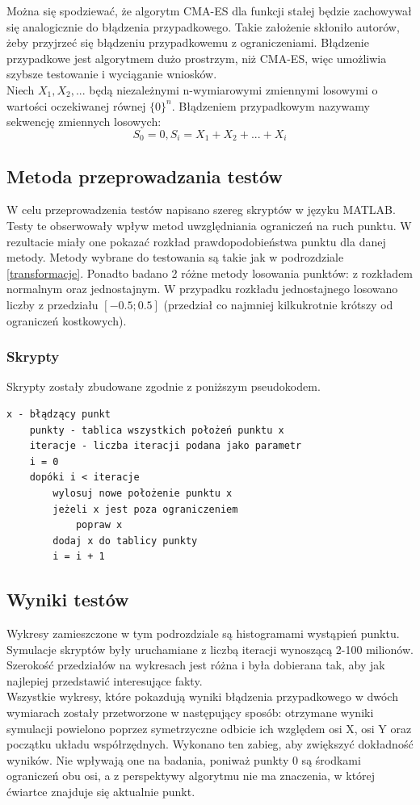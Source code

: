 \documentclass{mini}
\begin{document}
Można się spodziewać, że algorytm CMA-ES dla funkcji stałej będzie zachowywał się analogicznie do błądzenia przypadkowego. Takie założenie skłoniło autorów, żeby przyjrzeć się błądzeniu przypadkowemu z ograniczeniami. Błądzenie przypadkowe jest algorytmem dużo prostrzym, niż CMA-ES, więc umożliwia szybsze testowanie i wyciąganie wniosków.\\
Niech $ X_1, X_2, ... $ będą niezależnymi n-wymiarowymi zmiennymi losowymi o wartości oczekiwanej równej $ \{0\}^n $. Błądzeniem przypadkowym nazywamy sekwencję zmiennych losowych:
\begin{equation}
S_0 = 0, S_i=X_1+X_2+...+X_i
\end{equation}

\subsection{Metoda przeprowadzania testów}
W celu przeprowadzenia testów napisano szereg skryptów w języku MATLAB. Testy te obserwowały wpływ metod uwzględniania ograniczeń na ruch punktu. W rezultacie miały one pokazać rozkład prawdopodobieństwa punktu dla danej metody. Metody wybrane do testowania są takie jak w podrozdziale \ref{transformacje}.
Ponadto badano 2 różne metody losowania punktów: z rozkładem normalnym oraz jednostajnym. W przypadku rozkładu jednostajnego losowano liczby z przedziału $[-0.5; 0.5]$ (przedział co najmniej kilkukrotnie krótszy od ograniczeń kostkowych).


\subsubsection*{Skrypty}
Skrypty zostały zbudowane zgodnie z poniższym pseudokodem.
\begin{Verbatim}[baselinestretch=1.1]
	x - błądzący punkt
	punkty - tablica wszystkich położeń punktu x
	iteracje - liczba iteracji podana jako parametr
	i = 0
	dopóki i < iteracje
		wylosuj nowe położenie punktu x
		jeżeli x jest poza ograniczeniem
			popraw x
		dodaj x do tablicy punkty
		i = i + 1
\end{Verbatim}

\subsection{Wyniki testów}
Wykresy zamieszczone w tym podrozdziale są histogramami wystąpień punktu. Symulacje skryptów były uruchamiane z liczbą iteracji wynoszącą 2-100 milionów. Szerokość przedziałów na wykresach jest różna i była dobierana tak, aby jak najlepiej przedstawić interesujące fakty.\\
Wszystkie wykresy, które pokazdują wyniki błądzenia przypadkowego w dwóch wymiarach zostały przetworzone w następujący sposób: otrzymane wyniki symulacji powielono poprzez symetrzyczne odbicie ich względem osi X, osi Y oraz początku układu współrzędnych. Wykonano ten zabieg, aby zwiększyć dokładność wyników. Nie wpływają one na badania, poniważ punkty 0 są środkami ograniczeń obu osi, a z perspektywy algorytmu nie ma znaczenia, w której ćwiartce znajduje się aktualnie punkt.
\end{document}
